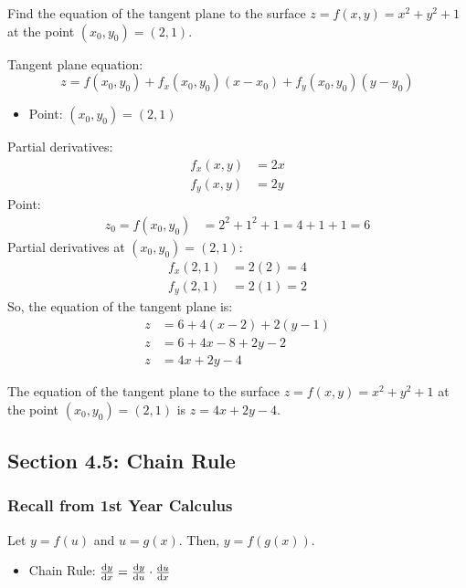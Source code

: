 \documentclass{article}
\begin{document}
\begin{examplebox}
    Find the equation of the tangent plane to the surface \( z = f(x, y) = x^2 + y^2 + 1 \) at the point \( (x_0, y_0) = (2, 1) \).

    \begin{solutionbox}
    Tangent plane equation:
    \[
        z = f(x_0, y_0) + f_x(x_0, y_0)(x - x_0) + f_y(x_0, y_0)(y - y_0)
    \]
    \begin{itemize}
        \item Point: \( (x_0, y_0) = (2, 1) \)
    \end{itemize}
    Partial derivatives:
    \begin{align*}
        f_x(x, y) &= 2x \\
        f_y(x, y) &= 2y
    \end{align*}
    Point:
    \begin{align*}
        z_0 = f(x_0, y_0) &= 2^2 + 1^2 + 1 = 4 + 1 + 1 = 6
    \end{align*}
    Partial derivatives at \( (x_0, y_0) = (2, 1) \):
    \begin{align*}
        f_x(2, 1) &= 2(2) = 4 \\
        f_y(2, 1) &= 2(1) = 2
    \end{align*}
    So, the equation of the tangent plane is:
    \begin{align*}
        z &= 6 + 4(x - 2) + 2(y - 1) \\
        z &= 6 + 4x - 8 + 2y - 2 \\
        z &= 4x + 2y - 4
    \end{align*}
    \begin{answerbox}
        The equation of the tangent plane to the surface \( z = f(x, y) = x^2 + y^2 + 1 \) at the point \( (x_0, y_0) = (2, 1) \) is \( z = 4x + 2y - 4 \).
    \end{answerbox}
    \end{solutionbox}
\end{examplebox}

\subsection*{Section 4.5: Chain Rule}

\subsubsection*{Recall from 1st Year Calculus}
Let \( y = f(u) \) and \( u = g(x) \). Then, \( y = f(g(x)) \).
\begin{itemize}
    \item Chain Rule: \( \dv{y}{x} = \dv{y}{u} \cdot \dv{u}{x} \)
\end{itemize}
\end{document}
